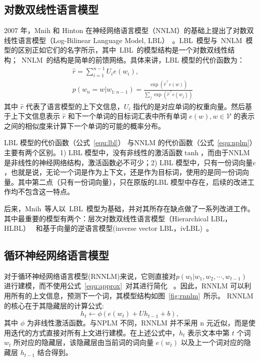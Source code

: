 \subsection{对数双线性语言模型}
2007 年，Mnih 和 Hinton 在神经网络语言模型（NNLM）的基础上提出了对数双线性语言模型（Log-Bilinear Language Model, LBL）~。LBL~模型与~NNLM~模型的区别正如它们的名字所示，其中~LBL~的模型结构是一个对数双线性结构；~NNLM~的结构是简单的前馈网络。具体来讲，LBL 模型的代价函数为：
\begin{equation}
\label{equ:lbl}
\begin{split}
   &\hat r=\sum_{i=1}^{n-1}{U_i e({w_i})}, \\
   &p(w_n=w|w_{1:n-1})=\frac{\exp(\hat r^\top e(w))}{\sum_j{\exp(\hat r^\top e(w_j))}}
\end{split}
\end{equation}
其中 $\hat r$ 代表了语言模型的上下文信息，$U_i$ 指代的是对应单词的权重向量。然后基于上下文信息表示 $\hat r$ 和下一个单词的目标词汇表中所有单词 $e(w),w\in \mathcal{V}$ 的表示之间的相似度来计算下一个单词的可能的概率分布。

LBL 模型的代价函数（公式~\ref{equ:lbl}） 与NNLM 的代价函数（公式~\ref{equ:nplm}）主要有两个区别。1) LBL 模型中，没有非线性的激活函数$\tanh$，而由于NNLM 是非线性的神经网络结构，激活函数必不可少；2) LBL 模型中，只有一份词向量$e$，也就是说，无论一个词是作为上下文，还是作为目标词，使用的是同一份词向量。其中第二点（只有一份词向量），只在原版的LBL 模型中存在，后续的改进工作均不包含这一特点。

后来，Mnih~等人以~LBL~模型为基础，并对其所存在缺点做了一系列改进工作。其中最重要的模型有两个：层次对数双线性语言模型（Hierarchical LBL，HLBL）~ 和基于向量的逆语言模型(inverse vector LBL，ivLBL)~。

\subsection{循环神经网络语言模型}
对于循环神经网络语言模型(RNNLM)来说，它则直接对$p(w_t | w_1,w_2,\cdots,w_{t-1}) $ 进行建模，而不使用公式~\ref{equ:approx}~对其进行简化~ 。因此，RNNLM 可以利用所有的上文信息，预测下一个词，其模型结构如图~\ref{fig:rnnlm}~所示。
RNNLM 的核心在于其隐藏层的计算公式:
\begin{equation}
\label{equ:rnn}
  h_t \leftarrow  \phi(e(w_t) + U h_{t-1} +b),
\end{equation}
其中 $\phi$ 为非线性激活函数。与NPLM 不同，RNNLM 并不采用 n 元近似，而是使用迭代的方式直接对所有上文进行建模。在上述公式中，$h_t$ 表示文本中第 $t$ 个词 $w_t$ 所对应的隐藏层，该隐藏层由当前词的词向量 $e(w_t)$ 以及上一个词对应的隐藏层 $h_{t -1}$ 结合得到。

